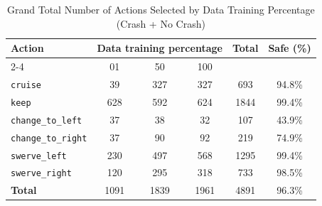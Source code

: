 \documentclass{article}
\begin{document}
\begin{table}[h]
\centering
\caption{Grand Total Number of Actions Selected by Data Training Percentage (Crash + No Crash)}
\begin{tabular}{l|ccc|c|c}
\toprule
\multirow{2}{*}{Action} & \multicolumn{3}{c|}{Data training percentage} & \multirow{2}{*}{Total} & \multirow{2}{*}{Safe (\%)} \\
\cmidrule{2-4}
 & 01 & 50 & 100 & & \\
\midrule
\texttt{cruise} & 39 & 327 & 327 & 693 & 94.8\% \\ 
\texttt{keep} & 628 & 592 & 624 & 1844 & 99.4\% \\ 
\texttt{change\_to\_left} & 37 & 38 & 32 & 107 & 43.9\% \\ 
\texttt{change\_to\_right} & 37 & 90 & 92 & 219 & 74.9\% \\ 
\texttt{swerve\_left} & 230 & 497 & 568 & 1295 & 99.4\% \\ 
\texttt{swerve\_right} & 120 & 295 & 318 & 733 & 98.5\% \\ 
\midrule
\textbf{Total} & 1091 & 1839 & 1961 & 4891 & 96.3\% \\ 
\bottomrule
\end{tabular}
\end{table}
\end{document}
